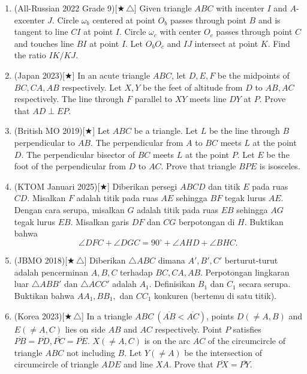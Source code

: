 \documentclass[letterpaper, 13pt]{scrartcl}
\begin{document}
\begin{enumerate}
  \item (All-Russian 2022 Grade 9)[$\bigstar\,\triangle$] Given triangle $ABC$ with incenter $I$ and $A$-excenter $J$. Circle $\omega_b$ centered at point $O_b$ passes through point $B$ and is tangent to line $CI$ at point $I$. Circle $\omega_c$ with center $O_c$ passes through point $C$ and touches line $BI$ at point $I$. Let $O_bO_c$ and $IJ$ intersect at point $K$. Find the ratio $IK/KJ$.

  \item (Japan 2023)[$\bigstar$] In an acute triangle $ABC$, let $D,E,F$ be the midpoints of $BC,CA,AB$ respectively. Let $X,Y$ be the feet of altitude from $D$ to $AB,AC$ respectively. The line through $F$ parallel to $XY$ meets line $DY$ at $P$. Prove that $AD\perp EP$.

  \item (British MO 2019)[$\bigstar$] Let $ABC$ be a triangle. Let $L$ be the line through $B$ perpendicular to $AB$. The perpendicular from $A$ to $BC$ meets $L$ at the point $D$. The perpendicular bisector of $BC$ meets $L$ at the point $P$. Let $E$ be the foot of the perpendicular from $D$ to $AC$. Prove that triangle $BPE$ is isosceles.

  \item (KTOM Januari 2025)[$\bigstar$] Diberikan persegi \(ABCD\) dan titik \(E\) pada ruas \(CD\). Misalkan \(F\) adalah titik pada ruas \(AE\) sehingga \(BF\) tegak lurus \(AE\). Dengan cara serupa, misalkan \(G\) adalah titik pada ruas \(EB\) sehingga \(AG\) tegak lurus \(EB\). Misalkan garis \(DF\) dan \(CG\) berpotongan di \(H\). Buktikan bahwa
\[
\angle DFC + \angle DGC = 90^\circ + \angle AHD + \angle BHC.
\]

  \item (JBMO 2018)[$\bigstar\,\triangle$] Diberikan $\triangle ABC$ dimana $A',B',C'$ berturut-turut adalah pencerminan $A,B,C$ terhadap $BC,CA,AB$. Perpotongan lingkaran luar $\triangle ABB'$ dan $\triangle ACC'$ adalah $A_1$. Definisikan $B_1$ dan $C_1$ secara serupa. Buktikan bahwa $AA_1,BB_1,$ dan $CC_1$ konkuren (bertemu di satu titik).

  \item (Korea 2023)[$\bigstar\,\triangle$] In a triangle $ABC ~(\overline{AB} < \overline{AC})$, points $D (\neq A, B)$ and $E (\neq A, C)$ lies on side $AB$ and $AC$ respectively. Point $P$ satisfies $\overline{PB}=\overline{PD}, \overline{PC}=\overline{PE}$. $X (\neq A, C)$ is on the arc $AC$ of the circumcircle of triangle $ABC$ not including $B$. Let $Y (\neq A)$ be the intersection of circumcircle of triangle $ADE$ and line $XA$. Prove that $\overline{PX} = \overline{PY}$.


\end{enumerate}
\end{document}
